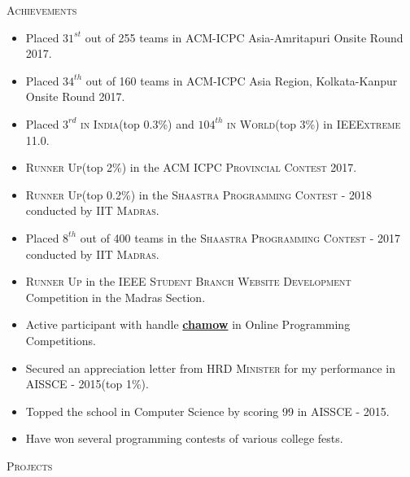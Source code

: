 \documentclass[11pt]{article}
\begin{document}
	{\centering\Large{\textsc{Achievements}} \hrulefill}
		
	\begin{itemize}
	\setlength\itemsep{-0.25em}
	\item Placed \textsc{$31^{st}$} out of 255 teams in \textsc{ACM-ICPC} Asia-Amritapuri Onsite Round 2017.
	\item Placed \textsc{$34^{th}$} out of 160 teams in \textsc{ACM-ICPC} Asia Region, Kolkata-Kanpur Onsite Round 2017.
	\item Placed \textsc{$3^{rd}$ in India}(top 0.3\%) and \textsc{$104^{th}$ in World}(top 3\%) in \textsc{IEEExtreme 11.0}.
	\item \textsc{Runner Up}(top 2\%) in the \textsc{ACM ICPC Provincial Contest 2017}.
	\item \textsc{Runner Up}(top 0.2\%) in the \textsc{Shaastra Programming Contest - 2018} conducted by \textsc{IIT Madras}.
	\item Placed \textsc{$8^{th}$} out of 400 teams in the \textsc{Shaastra Programming Contest - 2017} conducted by \textsc{IIT Madras}.
	\item \textsc{Runner Up} in the \textsc{IEEE Student Branch Website Development} Competition in the Madras Section.
	\item Active participant with handle \textbf{\href{https://www.stopstalk.com/user/profile/chamow}{chamow}} in Online Programming Competitions.	
	\item Secured an appreciation letter from \textsc{HRD Minister} for my performance in \textsc{AISSCE - 2015}(top 1\%).	
	\item Topped the school in Computer Science by scoring 99 in AISSCE - 2015.
	\item Have won several programming contests of various college fests.
	
	\end{itemize}
 	
	\vspace{2mm}

	{\centering\Large{\textsc{Projects}} \hrulefill}
		
\end{document}
